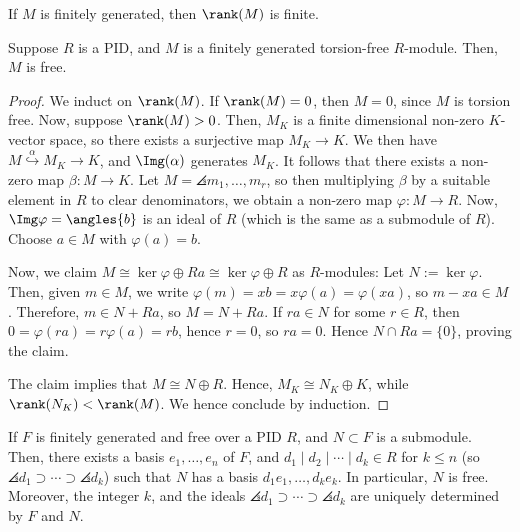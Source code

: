 \begin{rmk}
    If $M$ is finitely generated, then $\rank(M)$ is finite.
\end{rmk}

\begin{thm}
    Suppose $R$ is a PID, and $M$ is a finitely generated torsion-free $R$-module. Then, $M$ is free.
\end{thm}

\begin{proof}
    We induct on $\rank(M)$. If $\rank(M)=0$, then $M=0$, since $M$ is torsion free. Now, suppose $\rank(M) >0$. Then, $M_K$ is a finite dimensional non-zero $K$-vector space, so there exists a surjective map $M_K \to K$. We then have $M \overset{\alpha}{\hookrightarrow} M_K \to K$, and $\Img (\alpha)$ generates $M_K$. It follows that there exists a non-zero map $\beta :M \to K$. Let $M = \angles{m_1,\dots,m_r}$, so then multiplying $\beta$ by a suitable element in $R$ to clear denominators, we obtain a non-zero map $\varphi : M \to R$. Now, $\Img \varphi = \angles{b}$ is an ideal of $R$ (which is the same as a submodule of $R$). Choose $a \in M$ with $\varphi (a) = b$.

    Now, we claim $M \cong \ker \varphi \oplus Ra \cong \ker \varphi \oplus R$ as $R$-modules: Let $N:= \ker \varphi$. Then, given $m \in M$, we write $\varphi (m)=xb=x\varphi(a) = \varphi(xa)$, so $m - xa \in M$. Therefore, $m \in N + Ra$, so $M = N +Ra$. If $ra \in N$ for some $r \in R$, then $0=\varphi (ra) =r\varphi (a) = rb$, hence $r=0$, so $ra = 0$. Hence $N \cap Ra = \{0\}$, proving the claim.

    The claim implies that $M \cong N \oplus R$. Hence, $M_K \cong N_K \oplus K$, while $\rank (N_K) < \rank (M)$. We hence conclude by induction.
\end{proof}

\begin{prop}
    If $F$ is finitely generated and free over a PID $R$, and $N \subset F$ is a submodule. Then, there exists a basis $e_1,\dots,e_n$ of $F$, and $d_1\mid d_2 \mid \cdots \mid d_k \in R$ for $k \leq n$ (so $\angles{d_1}\supset \cdots \supset \angles{d_k}$) such that $N$ has a basis $d_1e_1,\dots,d_ke_k$. In particular, $N$ is free. Moreover, the integer $k$, and the ideals $\angles {d_1}\supset \cdots \supset \angles{d_k}$ are uniquely determined by $F$ and $N$.
\end{prop}

